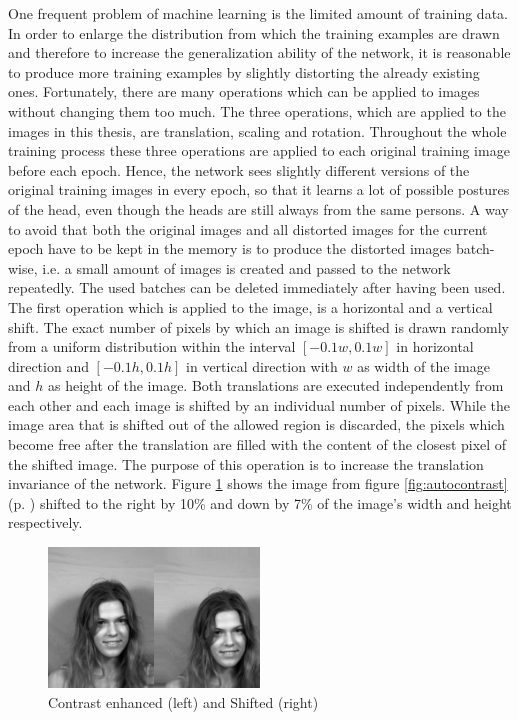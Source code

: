 \documentclass[11pt, a4paper]{article}
\newcommand\myref[1]{\ref{#1} (p. \pageref{#1})}
\begin{document}
One frequent problem of machine learning is the limited amount of training data. In order to enlarge the distribution from which the training examples are drawn and therefore to increase the generalization ability of the network, it is reasonable to produce more training examples by slightly distorting the already existing ones. Fortunately, there are many operations which can be applied to images without changing them too much. The three operations, which are applied to the images in this thesis, are translation, scaling and rotation. Throughout the whole training process these three operations are applied to each original training image before each epoch. Hence, the network sees slightly different versions of the original training images in every epoch, so that it learns a lot of possible postures of the head, even though the heads are still always from the same persons. A way to avoid that both the original images and all distorted images for the current epoch have to be kept in the memory is to produce the distorted images batch-wise, i.e. a small amount of images is created and passed to the network repeatedly. The used batches can be deleted immediately after having been used.\\
The first operation which is applied to the image, is a horizontal and a vertical shift. The exact number of pixels by which an image is shifted is drawn randomly from a uniform distribution within the interval $[-0.1w, 0.1w]$ in horizontal direction and $[-0.1h, 0.1h]$ in vertical direction with $w$ as width of the image and $h$ as height of the image. Both translations are executed independently from each other and each image is shifted by an individual number of pixels. While the image area that is shifted out of the allowed region is discarded, the pixels which become free after the translation are filled with the content of the closest pixel of the shifted image. The purpose of this operation is to increase the translation invariance of the network. Figure \ref{fig:autocontrast_shifted} shows the image from figure \myref{fig:autocontrast} shifted to the right by 10\% and down by 7\% of the image's width and height respectively.

\begin{figure}[htbp]
	\centering
	\includegraphics[width=0.5\textwidth]{autcontrast_shifted.png}
	\caption{Contrast enhanced (left) and Shifted (right)}
	\label{fig:autocontrast_shifted}
\end{figure}
\end{document}
